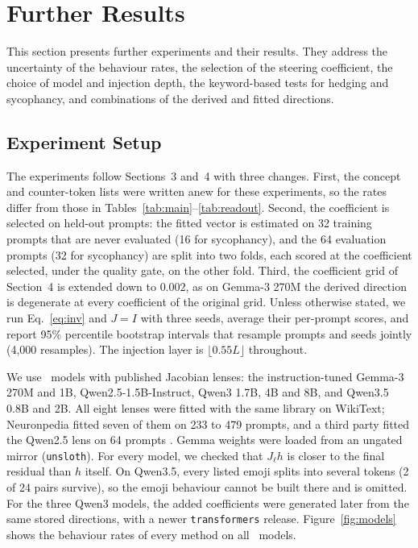 

\section{Further Results}
\label{app:further}

This section presents further experiments and their results. They address the uncertainty of the behaviour rates, the selection of the steering coefficient, the choice of model and injection depth, the keyword-based tests for hedging and sycophancy, and combinations of the derived and fitted directions.

\subsection{Experiment Setup}
\label{app:further-setup}

The experiments follow Sections~3 and~4 with three changes. First, the concept and counter-token lists were written anew for these experiments, so the rates differ from those in Tables~\ref{tab:main}--\ref{tab:readout}. Second, the coefficient is selected on held-out prompts: the fitted vector is estimated on 32 training prompts that are never evaluated (16 for sycophancy), and the 64 evaluation prompts (32 for sycophancy) are split into two folds, each scored at the coefficient selected, under the quality gate, on the other fold. Third, the coefficient grid of Section~4 is extended down to $0.002$, as on Gemma-3 270M the derived direction is degenerate at every coefficient of the original grid. Unless otherwise stated, we run Eq.~\ref{eq:inv} and $J{=}I$ with three seeds, average their per-prompt scores, and report 95\% percentile bootstrap intervals that resample prompts and seeds jointly (4{,}000 resamples). The injection layer is $\lfloor 0.55L \rfloor$ throughout.

We use \FNModels\ models with published Jacobian lenses: the instruction-tuned Gemma-3 270M and 1B, Qwen2.5-1.5B-Instruct, Qwen3 1.7B, 4B and 8B, and Qwen3.5 0.8B and 2B. All eight lenses were fitted with the same library on WikiText; Neuronpedia fitted seven of them on 233 to 479 prompts, and a third party fitted the Qwen2.5 lens on 64 prompts \citep{neuronpedia2026jlens}. Gemma weights were loaded from an ungated mirror (\texttt{unsloth}). For every model, we checked that $J_\ell h$ is closer to the final residual than $h$ itself. On Qwen3.5, every listed emoji splits into several tokens (2 of 24 pairs survive), so the emoji behaviour cannot be built there and is omitted. For the three Qwen3 models, the added coefficients were generated later from the same stored directions, with a newer \texttt{transformers} release. Figure~\ref{fig:models} shows the behaviour rates of every method on all \FNModels\ models.

